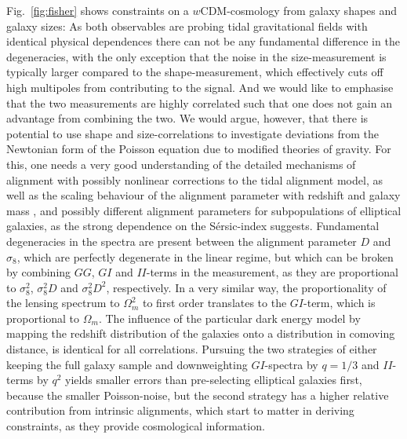 \documentclass[a4paper,fleqn,usenatbib]{mnras}
\begin{document}
Fig.~\ref{fig:fisher} shows constraints on a $w$CDM-cosmology from galaxy shapes and galaxy sizes: As both observables are probing tidal gravitational fields with identical physical dependences there can not be any fundamental difference in the degeneracies, with the only exception that the noise in the size-measurement is typically larger compared to the shape-measurement, which effectively cuts off high multipoles from contributing to the signal. And we would like to emphasise that the two measurements are highly correlated such that one does not gain an advantage from combining the two. We would argue, however, that there is potential to use shape and size-correlations to investigate deviations from the Newtonian form of the Poisson equation due to modified theories of gravity. For this, one needs a very good understanding of the detailed mechanisms of alignment with possibly nonlinear corrections to the tidal alignment model, as well as the scaling behaviour of the alignment parameter with redshift and galaxy mass \citep{hirata_intrinsic_2007}, and possibly different alignment parameters for subpopulations of elliptical galaxies, as the strong dependence on the S{\'e}rsic-index suggests. Fundamental degeneracies in the spectra are present between the alignment parameter $D$ and $\sigma_8$, which are perfectly degenerate in the linear regime, but which can be broken by combining $GG$, $GI$ and $II$-terms in the measurement, as they are proportional to $\sigma_8^2$, $\sigma_8^2D$ and $\sigma_8^2D^2$, respectively. In a very similar way, the proportionality of the lensing spectrum to $\Omega_m^2$ to first order translates to the $GI$-term, which is proportional to $\Omega_m$. The influence of the particular dark energy model by mapping the redshift distribution of the galaxies onto a distribution in comoving distance, is identical for all correlations. Pursuing the two strategies of either keeping the full galaxy sample and downweighting $GI$-spectra by $q=1/3$ and $II$-terms by $q^2$ yields smaller errors than pre-selecting elliptical galaxies first, because the smaller Poisson-noise, but the second strategy has a higher relative contribution from intrinsic alignments, which start to matter in deriving constraints, as they provide cosmological information.
\end{document}
